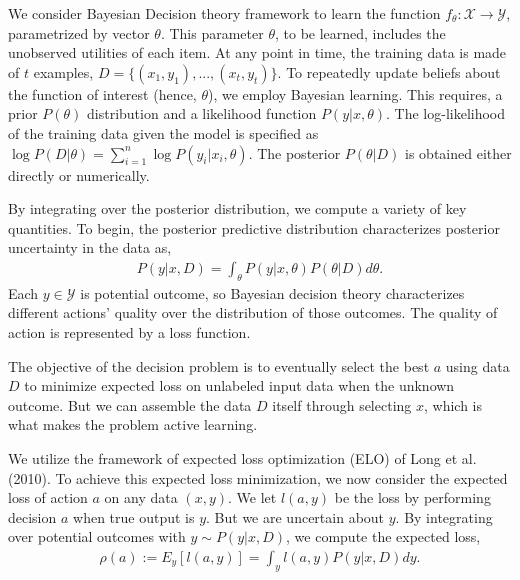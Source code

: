 \documentclass[a4paper,12pt]{article}
\newcommand{\numperset}{L}
\begin{document}
%


We consider Bayesian Decision theory framework to learn the function $f_\theta: \mathcal{X} \to \mathcal{Y}$, parametrized by vector $\theta$. This parameter $\theta$, to be learned, includes the unobserved utilities of each item. At any point in time, the training data is made of $t$ examples, $D = \{ (x_1,y_1),...,(x_t,y_t) \}$. To repeatedly update beliefs about the function of interest (hence, $\theta$), we employ Bayesian learning. This requires, a prior $P(\theta)$ distribution and a likelihood function $P(y|x,\theta)$. The log-likelihood of the training data given the model is specified as $\log P(D|\theta) = \sum_{i=1}^n \log P(y_i|x_i,\theta)$. The posterior $P(\theta|D)$ is obtained either directly or numerically. 

By integrating over the posterior distribution, we compute a variety of key quantities. To begin, the posterior predictive distribution characterizes posterior uncertainty in the data as,
\begin{align} 
P(y|x,D) = \int_\theta P(y|x,\theta)P(\theta|D)d\theta .
\end{align}
Each $y \in \mathcal{Y}$ is potential outcome, so Bayesian decision theory characterizes different actions' quality over the distribution of those outcomes. The quality of action is represented by a loss function. 

The objective of the decision problem is to eventually select the best $a$ using data $D$ to minimize expected loss on unlabeled input data when the unknown outcome. But we can assemble the data $D$ itself through selecting $x$, which is what makes the problem active learning. 

We utilize the framework of expected loss optimization (ELO) of Long et al. (2010). To achieve this expected loss minimization, we now consider the expected loss of action $a$ on any data  $(x,y)$. We let $l(a,y)$ be the loss by performing decision $a$ when true output is $y$. But we are uncertain about $y$. By integrating over potential outcomes with $y \sim P(y|x,D)$, we compute the expected loss,
\begin{align}
\rho(a) := E_{y} \left[ l(a,y) \right] = \int_y l(a,y) P(y|x,D) dy .
\end{align}
\end{document}
